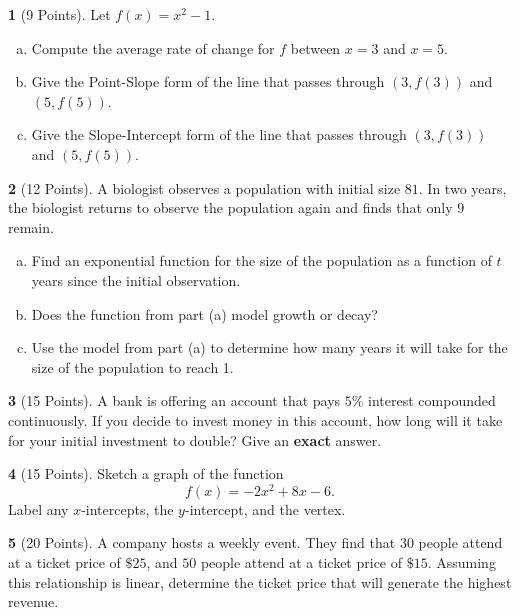 \documentclass[12pt]{amsart}
\theoremstyle{definition}
\newtheorem{thm}{}
\theoremstyle{definition}
\begin{document}
\newpage
\begin{thm}[9 Points]\label{ex9}
    Let $f(x) = x^2 - 1$.
  \begin{enumerate}[(a)]
  \item
    Compute the average rate of change for $f$ between $x = 3$ and $x = 5$.
    \vspace{2in}
  \item
    Give the Point-Slope form of the line that passes through $(3, f(3))$ and $(5, f(5))$.
    \vspace{2in}
  \item
    Give the Slope-Intercept form of the line that passes through $(3, f(3))$ and $(5, f(5))$.
  \end{enumerate}
\end{thm}

\newpage

\begin{thm}[12 Points]\label{ex9}
  A biologist observes a population with initial size $81$.
  In two years, the biologist returns to observe the population again and finds that only $9$ remain.
  \begin{enumerate}[(a)]
  \item
    Find an exponential function for the size of the population as a function of $t$ years since the initial observation.
    \vspace{2in}
  \item
    Does the function from part (a) model growth or decay?
    \vspace{2in}
  \item
    Use the model from part (a) to determine how many years it will take for the size of the population to reach 1.
  \end{enumerate}
\end{thm}

\newpage

\begin{thm}[15 Points]
  A bank is offering an account that pays $5\%$ interest compounded continuously.
  If you decide to invest money in this account, how long will it take for your initial investment to double?
  Give an {\bf exact} answer.
\end{thm}
\newpage

\begin{thm}[15 Points]
  Sketch a graph of the function
  $$f(x) = -2x^2 + 8x - 6.$$
  Label any $x$-intercepts, the $y$-intercept, and the vertex.
\end{thm}
\newpage

\begin{thm}[20 Points]\label{ex9}
  A company hosts a weekly event.
  They find that $30$ people attend at a ticket price of $\$25$, and $50$ people attend at a ticket price of $\$15$.
  Assuming this relationship is linear, determine the ticket price that will generate the highest revenue.
\end{thm}
\end{document}
